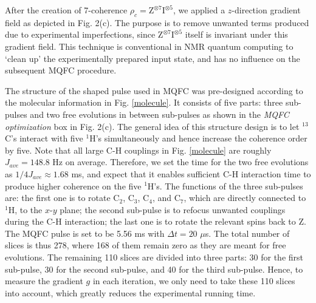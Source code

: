 \documentclass[twocolumn,reprint, amsmath,amssymb,showpacs,superscriptaddress]{revtex4-1}
\begin{document}
After the creation of 7-coherence $\rho_c= \text{Z}^{\otimes 7}\text{I}^{\otimes 5}$, we applied a $z$-direction gradient field as depicted in Fig. 2(c).  The purpose is to remove unwanted terms produced due to experimental imperfections, since $\text{Z}^{\otimes 7}\text{I}^{\otimes 5}$ itself is invariant under this gradient field. This technique is conventional in NMR quantum computing   to `clean up' the experimentally prepared input state, and has no influence on the subsequent MQFC procedure.

The structure of the shaped pulse used in MQFC was pre-designed according to the molecular information in Fig. \ref{molecule}. It consists of five parts: three sub-pulses and two free evolutions in between sub-pulses as shown in the \emph{MQFC optimization} box in Fig. 2(c). The general idea of this structure design is to let $^{13}$C's interact with five $^1$H's simultaneously and hence increase the coherence order by five. Note that all large C-H couplings in Fig. \ref{molecule} are   roughly $J_{ave}=148.8$ Hz on average. Therefore, we set the time for the two free evolutions as $1/4J_{ave} \approx 1.68$ ms, and expect that it enables sufficient C-H interaction time to produce higher coherence on the five $^1$H's. The functions of   the three sub-pulses are: the first one is to rotate C$_2$, C$_3$, C$_4$, and C$_7$, which are directly connected to $^1$H, to the $x$-$y$ plane; the second sub-pulse is to refocus unwanted couplings during the C-H interaction; the last one is to rotate the relevant spins back to Z. The MQFC pulse is set to be 5.56 ms  with $\Delta t=20$ $\mu$s. The total number of slices is thus 278, where 168 of them remain zero as they are meant for free evolutions. The remaining 110 slices are divided into three parts: 30 for the first sub-pulse, 30 for the second sub-pulse, and 40 for the third sub-pulse. Hence, to measure the gradient $g$ in each iteration, we only need to take these 110 slices into account, which greatly reduces the experimental running time.
\end{document}
